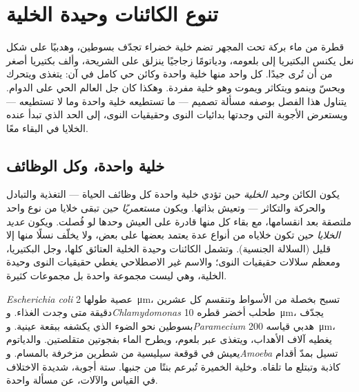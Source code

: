 \chapter{تنوع الكائنات وحيدة الخلية}\label{ch:b2:unicellular-diversity}

قطرة من ماء بركة تحت المجهر تضم خلية خضراء تجدّف بسوطين، وهدبيًا على
شكل نعل يكنس البكتيريا إلى بلعومه، ودياتومًا زجاجيًا ينزلق على
الشريحة، وألف بكتيريا أصغر من أن تُرى جيدًا. كل واحد منها خلية واحدة
وكائن حي كامل في آن: يتغذى ويتحرك ويحسّ وينمو ويتكاثر ويموت وهو خلية
مفردة. وهكذا كان جل العالم الحي على الدوام. يتناول هذا الفصل  بوصفه مسألة تصميم --- ما تستطيعه خلية واحدة وما لا
تستطيعه --- ويستعرض الأجوبة التي وجدتها بدائيات النوى وحقيقيات
النوى، إلى الحد الذي تبدأ عنده الخلايا في البقاء معًا.

\section{خلية واحدة، وكل الوظائف}

\begin{definition}\label{def:b2:unicellular-diversity:unicellular}
يكون الكائن \emph{وحيد الخلية} حين تؤدي خلية
واحدة كل وظائف الحياة --- التغذية والتبادل والحركة والتكاثر ---
وتعيش بذاتها. ويكون \emph{مستعمريًا} حين تبقى
خلايا من نوع واحد ملتصقة بعد انقسامها، مع بقاء كل منها قادرة على
العيش وحدها لو فُصلت. ويكون \emph{عديد الخلايا}
حين تكون خلاياه من أنواع عدة يعتمد بعضها على بعض، ولا يخلّف نسلًا منها إلا قليل (السلالة الجنسية). وتشمل الكائنات وحيدة
الخلية العتائق كلها، وجل البكتيريا، ومعظم سلالات حقيقيات النوى؛
والاسم غير الاصطلاحي \emph{} يغطي حقيقيات النوى وحيدة
الخلية، وهي ليست مجموعة واحدة بل مجموعات كثيرة.
\end{definition}

\begin{example}\label{ex:b2:unicellular-diversity:drop}
\emph{Escherichia coli} عصية طولها \qty{2}{\micro m}، تسبح بخصلة من
الأسواط وتنقسم كل عشرين دقيقة متى وجدت الغذاء.
و\emph{Chlamydomonas} طحلب أخضر قطره \qty{10}{\micro m}، يجدّف
بسوطين نحو الضوء الذي يكشفه ببقعة عينية. و\emph{Paramecium} هدبي
قياسه \qty{200}{\micro m}، يغطيه آلاف الأهداب، ويتغذى عبر بلعوم،
ويطرح الماء بفجوتين متقلصتين. والدياتوم يعيش في قوقعة سيليسية من
شطرين مزخرفة بالمسام. و\emph{Amoeba} تسيل بمدّ أقدام كاذبة وتبتلع
ما تلقاه. وخلية الخميرة تُبرعم بنتًا من جنبها. ستة أجوبة، شديدة
الاختلاف في القياس والآلات، عن مسألة واحدة.
\end{example}

